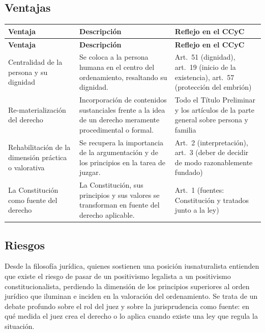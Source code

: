 \documentclass[12pt,oneside]{book}
\begin{document}
\subsection{Ventajas}

\begin{longtable}{@{}B{0.20\textwidth}L{0.34\textwidth}L{0.34\textwidth}@{}}
\toprule
\textbf{Ventaja} & \textbf{Descripción} & \textbf{Reflejo en el CCyC} \\
\midrule
\endfirsthead
\toprule
\textbf{Ventaja} & \textbf{Descripción} & \textbf{Reflejo en el CCyC} \\
\midrule
\endhead
\bottomrule
\endfoot
Centralidad de la persona y su dignidad & Se coloca a la persona humana en el centro del ordenamiento, resaltando su dignidad. & Art.~51 (dignidad), art.~19 (inicio de la existencia), art.~57 (protección del embrión) \\
Re-materialización del derecho & Incorporación de contenidos sustanciales frente a la idea de un derecho meramente procedimental o formal. & Todo el Título Preliminar y los artículos de la parte general sobre persona y familia \\
Rehabilitación de la dimensión práctica o valorativa & Se recupera la importancia de la argumentación y de los principios en la tarea de juzgar. & Art.~2 (interpretación), art.~3 (deber de decidir de modo razonablemente fundado) \\
La Constitución como fuente del derecho & La Constitución, sus principios y sus valores se transforman en fuente del derecho aplicable. & Art.~1 (fuentes: Constitución y tratados junto a la ley) \\
\end{longtable}

\subsection{Riesgos}

Desde la filosofía jurídica, quienes sostienen una posición iusnaturalista entienden que existe el riesgo de pasar de un positivismo legalista a un positivismo constitucionalista, perdiendo la dimensión de los principios superiores al orden jurídico que iluminan e inciden en la valoración del ordenamiento. Se trata de un debate profundo sobre el rol del juez y sobre la jurisprudencia como fuente: en qué medida el juez crea el derecho o lo aplica cuando existe una ley que regula la situación.
\end{document}
